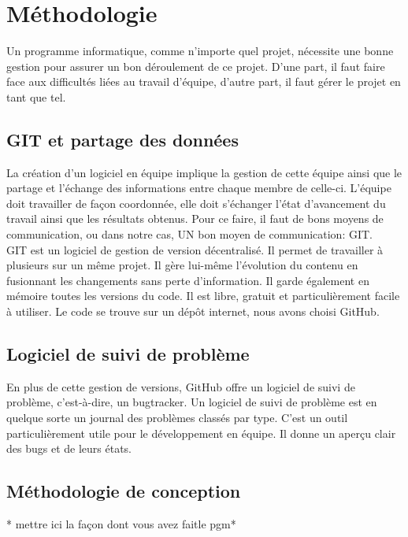 \section{Méthodologie}
Un programme informatique, comme n'importe quel projet, nécessite une bonne gestion pour assurer un bon déroulement de ce projet.
D'une part, il faut faire face aux difficultés liées au travail d'équipe, d'autre part, il faut gérer le projet en tant que tel.

  \subsection{GIT et partage des données}
  La création d'un logiciel en équipe implique la gestion de cette équipe ainsi que le partage et l'échange des
  informations entre chaque membre de celle-ci.
  L'équipe doit travailler de façon coordonnée, elle doit s'échanger l'état
  d'avancement du travail ainsi que les résultats obtenus. Pour ce faire, il faut
  de bons moyens de communication, ou dans notre cas, UN bon moyen de communication: GIT\cite{git}. \\

  GIT est un logiciel de gestion de version décentralisé. Il permet de
  travailler à plusieurs sur un même projet. Il gère lui-même l'évolution du
  contenu en fusionnant les changements sans perte d'information. Il garde
  également en mémoire toutes les versions du code. Il est libre, gratuit et
  particulièrement facile à utiliser. Le code se trouve sur un dépôt internet, nous avons choisi GitHub\cite{github}.\\

  \subsection{Logiciel de suivi de problème}
  En plus de cette gestion de versions, GitHub offre un logiciel de suivi de problème, c'est-à-dire, un bugtracker.
  Un logiciel de suivi de problème est en quelque sorte un journal des problèmes classés par type.
  C'est un outil particulièrement utile pour le développement en équipe. Il donne un aperçu clair des bugs et de leurs états.

  \subsection{Méthodologie de conception}
    * mettre ici la façon dont vous avez \og fait\fg le pgm* \\
    
